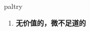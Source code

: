 
\begin{frame}
{\huge paltry}
\begin{center}
\begin{enumerate}\Large
  \item \textbf{无价值的，微不足道的}
\end{enumerate}
\end{center}
\end{frame}
